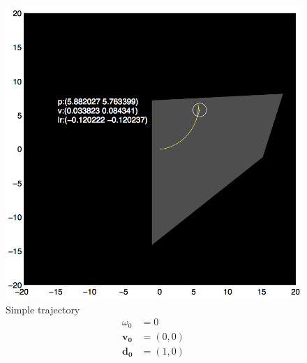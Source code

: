 \documentclass{report}
\begin{document}
\begin{figure}
\begin{minipage}[t]{0.45\linewidth}
    \centering
    \includegraphics[width=\linewidth]{fig1.png}
    \captionsetup{singlelinecheck=off}
    \caption[.]{\label{fig:fig1}Simple trajectory \begin{align*}
    \omega_0 &= 0 \\
    \mathbf{v_0} &= (0, 0)\\
    \mathbf{d_0} &= (1, 0)
    \end{align*}
    }
\end{minipage}
\hfill
\begin{minipage}[t]{0.45\linewidth}
    \centering
    

\end{minipage}
\end{figure}
\end{document}
